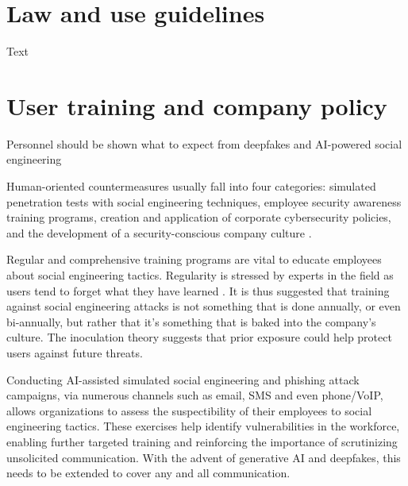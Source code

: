 \section{Law and use guidelines}
\begin{comment}
    
    - The best defense against SE attacks is an educated, conscious user
    - User education should be continuous and not a one-off event

\end{comment}

Text


\section{User training and company policy}
\begin{comment}
    
    - The best defense against SE attacks is an educated, conscious user
    - User education should be continuous and not a one-off event

\end{comment}

Personnel should be shown what to expect from deepfakes and AI-powered social engineering \citep{mirsky_Creation_Detection_Deepfakes_2021}

Human-oriented countermeasures usually fall into four categories: simulated penetration tests with social engineering techniques, employee security awareness training programs, creation and application of corporate cybersecurity policies, and the development of a security-conscious company culture \citep{tsinganosTowardsAnAutomatedRecognitionSystem2018, mitnick_The_Art_of_Deception_2003}.

Regular and comprehensive training programs are vital to educate employees about social engineering tactics. Regularity is stressed by experts in the field as users tend to forget what they have learned \citep{hadnagySocialEngineering2018, mitnick_The_Art_of_Deception_2003}. It is thus suggested that training against social engineering attacks is not something that is done annually, or even bi-annually, but rather that it's something that is baked into the company's culture. The inoculation theory \citep{blauth_AI_Crime_Overview_Malicious_Use_Abuse_2022} suggests that prior exposure could help protect users against future threats.

Conducting AI-assisted simulated social engineering and phishing attack campaigns, via numerous channels such as email, SMS and even phone/VoIP, allows organizations to assess the suspectibility of their employees to social engineering tactics. These exercises help identify vulnerabilities in the workforce, enabling further targeted training and reinforcing the importance of scrutinizing unsolicited communication. With the advent of generative AI and deepfakes, this needs to be extended to cover any and all communication.

